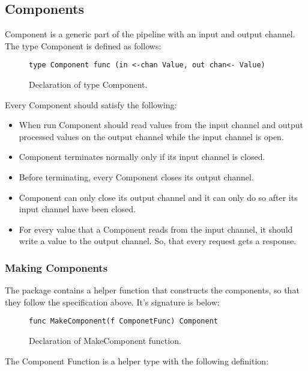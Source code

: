 \documentclass[12pt,a4paper]{article}
\begin{document}
\subsection{Components}
Component is a generic part of the pipeline with an input and output channel.
The type Component is defined as follows:


\begin{figure}[h]
\centering
\begin{lstlisting}
type Component func (in <-chan Value, out chan<- Value)
\end{lstlisting}
\caption[scale=1.0]{Declaration of type Component.}
\label{fig:Component}
\end{figure}


Every Component should satisfy the following:
\begin{itemize}
  \item When run Component should read values from the input channel
				and output processed values on the output channel while the input 
				channel is open.
	\item Component terminates normally only if its input channel is closed.
	\item Before terminating, every Component closes its output channel.
	\item Component can only close its output channel and it can only do so
				after its input channel have been closed.
	\item For every value that a Component reads from the input channel, 
				it should write a value to the output channel. So, that every request 
				gets a response.
  
\end{itemize}

\subsubsection{Making Components}
The package contains a helper function that constructs the components,
so that they follow the specification above. It's signature is below:

\begin{figure}[h]
\centering
\begin{lstlisting}
func MakeComponent(f ComponetFunc) Component
\end{lstlisting}
\caption[scale=1.0]{Declaration of MakeComponent function.}
\label{fig:MakeComponent}
\end{figure}


The Component Function is a helper type with the following definition:
\end{document}
